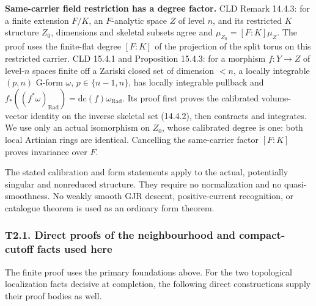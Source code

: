 \documentclass[
  10pt,
]{article}
\begin{document}
\begin{enumerate}
  \textbf{Same-carrier field restriction has a degree factor.} CLD
  Remark 14.4.3: for a finite extension \(F/K\), an \(F\)-analytic space
  \(Z\) of level \(n\), and its restricted \(K\) structure \(Z_0\),
  dimensions and skeletal subsets agree and \(\mu_{Z_0}=[F:K]\mu_Z\).
  The proof uses the finite-flat degree \([F:K]\) of the projection of
  the split torus on this restricted carrier. CLD 15.4.1 and Proposition
  15.4.3: for a morphism \(f:Y\to Z\) of level-\(n\) spaces finite off a
  Zariski closed set of dimension \(<n\), a locally integrable \((p,n)\)
  G-form \(\omega\), \(p\in\{n-1,n\}\), has locally integrable pullback
  and
  \(f_*((f^*\omega)_{\mathrm{Rad}})=\mathrm{dc}(f)\omega_{\mathrm{Rad}}\).
  Its proof first proves the calibrated volume-vector identity on the
  inverse skeletal set (14.4.2), then contracts and integrates. We use
  only an actual isomorphism on \(Z_0\), whose calibrated degree is one:
  both local Artinian rings are identical. Cancelling the same-carrier
  factor \([F:K]\) proves invariance over \(F\).
\end{enumerate}

The stated calibration and form statements apply to the actual,
potentially singular and nonreduced structure. They require no
normalization and no quasi-smoothness. No weakly smooth GJR descent,
positive-current recognition, or catalogue theorem is used as an
ordinary form theorem.

\subsubsection{T2.1. Direct proofs of the neighbourhood and
compact-cutoff facts used
here}\label{t2.1.-direct-proofs-of-the-neighbourhood-and-compact-cutoff-facts-used-here}

The finite proof uses the primary foundations above. For the two
topological localization facts decisive at completion, the following
direct constructions supply their proof bodies as well.
\end{document}
